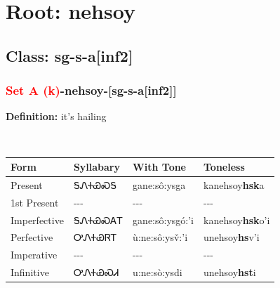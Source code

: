 \needspace{4in}
\section*{Root: nehsoy}
\nopagebreak
{}
\needspace{3in}
\subsection*{Class: sg-s-a[inf2]}
\nopagebreak
\needspace{2in}
\subsubsection*{\textcolor{Red}{Set A (k)}{-}\textbf{nehsoy}{-}[sg-s-a[inf2]]}
\nopagebreak
\textbf{Definition: } it{\textquoteright}s hailing
\\[0.5em]
\begin{tabularx}{\textwidth}{l X X X}%
\toprule%
\textbf{Form}&\textbf{Syllabary}&\textbf{With Tone}&\textbf{Toneless}\\%
\midrule%
Present&ᎦᏁᏐᏯᏍᎦ&gane:sô:ysga&kanehsoy\textbf{hsk}a\\%
1st Present&{-}{-}{-}&{-}{-}{-}&{-}{-}{-}\\%
Imperfective&ᎦᏁᏐᏯᏍᎪᎢ&gane:sô:ysgó:’i&kanehsoy\textbf{hsk}o'i\\%
Perfective&ᎤᏁᏐᏯᏒᎢ&ù:ne:sô:ysv̌:’i&unehsoy\textbf{hs}v'i\\%
Imperative&{-}{-}{-}&{-}{-}{-}&{-}{-}{-}\\%
Infinitive&ᎤᏁᏐᏯᏍᏗ&u:ne:sò:ysdi&unehsoy\textbf{hst}i\\%
\bottomrule%
\end{tabularx}
\\[1em]
